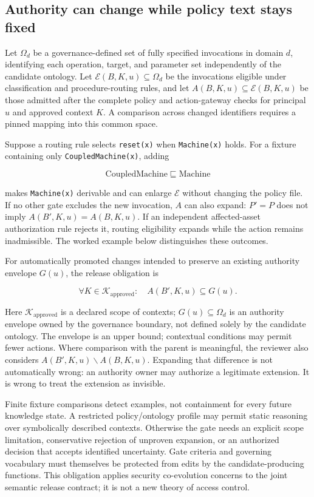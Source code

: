 \documentclass[preprint,12pt,authoryear]{elsarticle}
\begin{document}
\subsection{Authority can change while policy text stays
fixed}\label{authority-can-change-while-policy-text-stays-fixed}

Let \(\Omega_d\) be a governance-defined set of fully specified
invocations in domain \(d\), identifying each operation, target, and
parameter set independently of the candidate ontology. Let
\(\mathcal{E}(B,K,u)\subseteq\Omega_d\) be the invocations eligible
under classification and procedure-routing rules, and let
\(A(B,K,u)\subseteq\mathcal{E}(B,K,u)\) be those admitted after the
complete policy and action-gateway checks for principal \(u\) and
approved context \(K\). A comparison across changed identifiers requires
a pinned mapping into this common space.

Suppose a routing rule selects \texttt{reset(x)} when
\texttt{Machine(x)} holds. For a fixture containing only
\texttt{CoupledMachine(x)}, adding

\[\mathrm{CoupledMachine}\sqsubseteq\mathrm{Machine}\]

makes \texttt{Machine(x)} derivable and can enlarge \(\mathcal{E}\)
without changing the policy file. If no other gate excludes the new
invocation, \(A\) can also expand: \(P'=P\) does not imply
\(A(B',K,u)=A(B,K,u)\). If an independent affected-asset authorization
rule rejects it, routing eligibility expands while the action remains
inadmissible. The worked example below distinguishes these outcomes.

For automatically promoted changes intended to preserve an existing
authority envelope \(G(u)\), the release obligation is

\[\forall K\in\mathcal{K}_{\mathrm{approved}}:\quad A(B',K,u)\subseteq G(u).\]

Here \(\mathcal{K}_{\mathrm{approved}}\) is a declared scope of
contexts; \(G(u)\subseteq\Omega_d\) is an authority envelope owned by
the governance boundary, not defined solely by the candidate ontology.
The envelope is an upper bound; contextual conditions may permit fewer
actions. Where comparison with the parent is meaningful, the reviewer
also considers \(A(B',K,u)\smallsetminus A(B,K,u)\). Expanding that
difference is not automatically wrong: an authority owner may authorize
a legitimate extension. It is wrong to treat the extension as invisible.

Finite fixture comparisons detect examples, not containment for every
future knowledge state. A restricted policy/ontology profile may permit
static reasoning over symbolically described contexts. Otherwise the
gate needs an explicit scope limitation, conservative rejection of
unproven expansion, or an authorized decision that accepts identified
uncertainty. Gate criteria and governing vocabulary must themselves be
protected from edits by the candidate-producing functions. This
obligation applies security co-evolution concerns to the joint semantic
release contract; it is not a new theory of access control.
\end{document}
